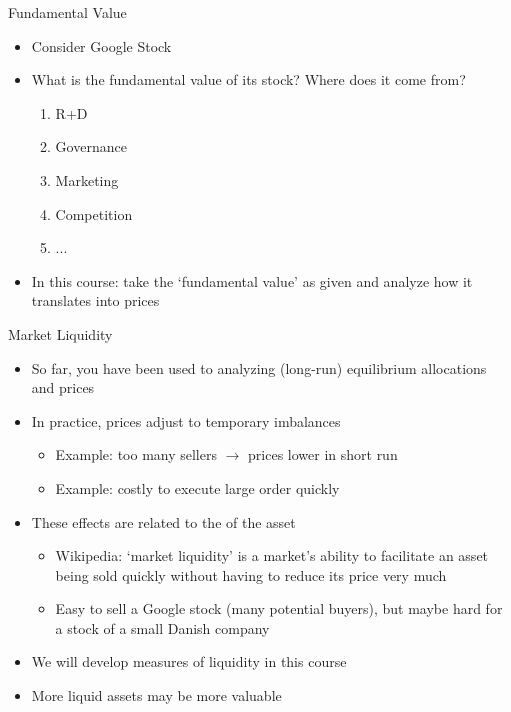 \begin{frame}[label=main4]{Fundamental Value}
\begin{itemize}
	\item Consider Google Stock
	\item What is the fundamental value of its stock? Where does it come from?
	\begin{enumerate}
		\item R+D
		\item Governance
		\item Marketing
		\item Competition
		\item ...
	\end{enumerate}
	\item In this course: take the `fundamental value' as given and analyze how it translates into prices
	
	\hyperlink{quote}{}
\end{itemize}
\end{frame}


\begin{frame}{Market Liquidity}
\begin{itemize}
	\item So far, you have been used to analyzing (long-run) equilibrium allocations and prices
	\item In practice, prices adjust to temporary imbalances
	\begin{itemize}
		\item Example: too many sellers $\rightarrow$ prices lower in short run
		\item Example: costly to execute large order quickly
	\end{itemize}
	\item These effects are related to the  of the asset
	\begin{itemize}
		\item Wikipedia: `market liquidity' is a market's ability to facilitate an asset being sold quickly without having to reduce its price very much
		\item Easy to sell a Google stock (many potential buyers), but maybe hard for a stock of a small Danish company
	\end{itemize}
	\item We will develop measures of liquidity in this course
	\item More liquid assets may be more valuable
\end{itemize}
\end{frame}


